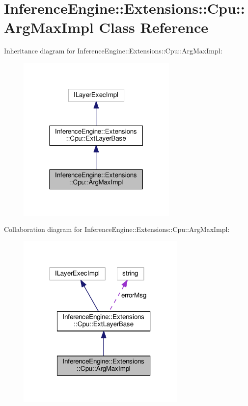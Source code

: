 \hypertarget{classInferenceEngine_1_1Extensions_1_1Cpu_1_1ArgMaxImpl}{}\section{Inference\+Engine\+:\+:Extensions\+:\+:Cpu\+:\+:Arg\+Max\+Impl Class Reference}
\label{classInferenceEngine_1_1Extensions_1_1Cpu_1_1ArgMaxImpl}


Inheritance diagram for Inference\+Engine\+:\+:Extensions\+:\+:Cpu\+:\+:Arg\+Max\+Impl\+:
\nopagebreak
\begin{figure}[H]
\begin{center}
\leavevmode
\includegraphics[width=222pt]{classInferenceEngine_1_1Extensions_1_1Cpu_1_1ArgMaxImpl__inherit__graph}
\end{center}
\end{figure}


Collaboration diagram for Inference\+Engine\+:\+:Extensions\+:\+:Cpu\+:\+:Arg\+Max\+Impl\+:
\nopagebreak
\begin{figure}[H]
\begin{center}
\leavevmode
\includegraphics[width=234pt]{classInferenceEngine_1_1Extensions_1_1Cpu_1_1ArgMaxImpl__coll__graph}
\end{center}
\end{figure}
